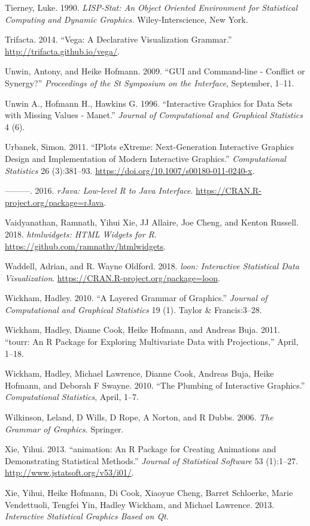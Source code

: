 \documentclass[12pt,]{article}
\theoremstyle{definition}
\theoremstyle{definition}
\theoremstyle{definition}
\theoremstyle{remark}
\begin{document}
\leavevmode\hypertarget{ref-LISP-STAT}{}%
Tierney, Luke. 1990. \emph{LISP-Stat: An Object Oriented Environment for
Statistical Computing and Dynamic Graphics.} Wiley-Interscience, New
York.

\leavevmode\hypertarget{ref-vega}{}%
Trifacta. 2014. ``Vega: A Declarative Visualization Grammar.''
\url{http://trifacta.github.io/vega/}.

\leavevmode\hypertarget{ref-Unwin:1999vp}{}%
Unwin, Antony, and Heike Hofmann. 2009. ``GUI and Command-line -
Conflict or Synergy?'' \emph{Proceedings of the St Symposium on the
Interface}, September, 1--11.

\leavevmode\hypertarget{ref-MANET}{}%
Unwin A., Hofmann H., Hawkins G. 1996. ``Interactive Graphics for Data
Sets with Missing Values - Manet.'' \emph{Journal of Computational and
Graphical Statistics} 4 (6).

\leavevmode\hypertarget{ref-Urbanek2011}{}%
Urbanek, Simon. 2011. ``IPlots eXtreme: Next-Generation Interactive
Graphics Design and Implementation of Modern Interactive Graphics.''
\emph{Computational Statistics} 26 (3):381--93.
\url{https://doi.org/10.1007/s00180-011-0240-x}.

\leavevmode\hypertarget{ref-rJava}{}%
---------. 2016. \emph{rJava: Low-level R to Java Interface}.
\url{https://CRAN.R-project.org/package=rJava}.

\leavevmode\hypertarget{ref-htmlwidgets}{}%
Vaidyanathan, Ramnath, Yihui Xie, JJ Allaire, Joe Cheng, and Kenton
Russell. 2018. \emph{htmlwidgets: HTML Widgets for R}.
\url{https://github.com/ramnathv/htmlwidgets}.

\leavevmode\hypertarget{ref-loon}{}%
Waddell, Adrian, and R. Wayne Oldford. 2018. \emph{loon: Interactive
Statistical Data Visualization}.
\url{https://CRAN.R-project.org/package=loon}.

\leavevmode\hypertarget{ref-ggplot2-paper}{}%
Wickham, Hadley. 2010. ``A Layered Grammar of Graphics.'' \emph{Journal
of Computational and Graphical Statistics} 19 (1). Taylor \&
Francis:3--28.

\leavevmode\hypertarget{ref-tourr}{}%
Wickham, Hadley, Dianne Cook, Heike Hofmann, and Andreas Buja. 2011.
``tourr: An R Package for Exploring Multivariate Data with
Projections,'' April, 1--18.

\leavevmode\hypertarget{ref-plumbing}{}%
Wickham, Hadley, Michael Lawrence, Dianne Cook, Andreas Buja, Heike
Hofmann, and Deborah F Swayne. 2010. ``The Plumbing of Interactive
Graphics.'' \emph{Computational Statistics}, April, 1--7.

\leavevmode\hypertarget{ref-wilkinson}{}%
Wilkinson, Leland, D Wills, D Rope, A Norton, and R Dubbs. 2006.
\emph{The Grammar of Graphics}. Springer.

\leavevmode\hypertarget{ref-animation}{}%
Xie, Yihui. 2013. ``animation: An R Package for Creating Animations and
Demonstrating Statistical Methods.'' \emph{Journal of Statistical
Software} 53 (1):1--27. \url{http://www.jstatsoft.org/v53/i01/}.

\leavevmode\hypertarget{ref-cranvas}{}%
Xie, Yihui, Heike Hofmann, Di Cook, Xiaoyue Cheng, Barret Schloerke,
Marie Vendettuoli, Tengfei Yin, Hadley Wickham, and Michael Lawrence.
2013. \emph{Interactive Statistical Graphics Based on Qt}.
\end{document}
